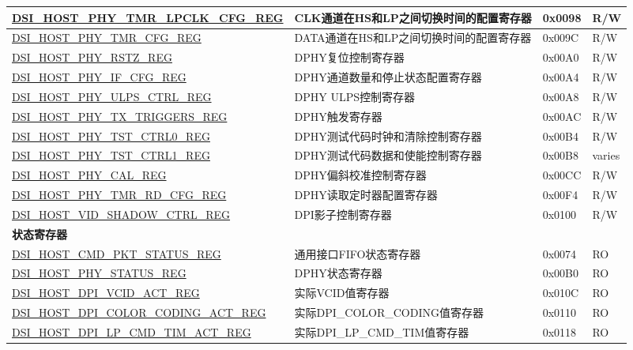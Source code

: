 \begin{longtable}{ | p{6.8cm} | p{6.5cm} | p{1.2cm} | p{1cm} | }
\hyperref[regdesc:DSIHOSTPHYTMRLPCLKCFGREG]{DSI\_HOST\_PHY\_TMR\_LPCLK\_CFG\_REG} & CLK通道在HS和LP之间切换时间的配置寄存器 & 0x0098 & R/W \\ \hline
\hyperref[regdesc:DSIHOSTPHYTMRCFGREG]{DSI\_HOST\_PHY\_TMR\_CFG\_REG} & DATA通道在HS和LP之间切换时间的配置寄存器 & 0x009C & R/W \\ \hline
\hyperref[regdesc:DSIHOSTPHYRSTZREG]{DSI\_HOST\_PHY\_RSTZ\_REG} & DPHY复位控制寄存器 & 0x00A0 & R/W \\ \hline
\hyperref[regdesc:DSIHOSTPHYIFCFGREG]{DSI\_HOST\_PHY\_IF\_CFG\_REG} & DPHY通道数量和停止状态配置寄存器 & 0x00A4 & R/W \\ \hline
\hyperref[regdesc:DSIHOSTPHYULPSCTRLREG]{DSI\_HOST\_PHY\_ULPS\_CTRL\_REG} & DPHY ULPS控制寄存器 & 0x00A8 & R/W \\ \hline
\hyperref[regdesc:DSIHOSTPHYTXTRIGGERSREG]{DSI\_HOST\_PHY\_TX\_TRIGGERS\_REG} & DPHY触发寄存器 & 0x00AC & R/W \\ \hline
\hyperref[regdesc:DSIHOSTPHYTSTCTRL0REG]{DSI\_HOST\_PHY\_TST\_CTRL0\_REG} & DPHY测试代码时钟和清除控制寄存器 & 0x00B4 & R/W \\ \hline
\hyperref[regdesc:DSIHOSTPHYTSTCTRL1REG]{DSI\_HOST\_PHY\_TST\_CTRL1\_REG} & DPHY测试代码数据和使能控制寄存器 & 0x00B8 & varies \\ \hline
\hyperref[regdesc:DSIHOSTPHYCALREG]{DSI\_HOST\_PHY\_CAL\_REG} & DPHY偏斜校准控制寄存器 & 0x00CC & R/W \\ \hline
\hyperref[regdesc:DSIHOSTPHYTMRRDCFGREG]{DSI\_HOST\_PHY\_TMR\_RD\_CFG\_REG} & DPHY读取定时器配置寄存器 & 0x00F4 & R/W \\ \hline
\hyperref[regdesc:DSIHOSTVIDSHADOWCTRLREG]{DSI\_HOST\_VID\_SHADOW\_CTRL\_REG} & DPI影子控制寄存器 & 0x0100 & R/W \\ \hline
\multicolumn{4}{|l|}{\textbf{状态寄存器}} \\ \hline
\hyperref[regdesc:DSIHOSTCMDPKTSTATUSREG]{DSI\_HOST\_CMD\_PKT\_STATUS\_REG} & 通用接口FIFO状态寄存器 & 0x0074 & RO \\ \hline
\hyperref[regdesc:DSIHOSTPHYSTATUSREG]{DSI\_HOST\_PHY\_STATUS\_REG} & DPHY状态寄存器 & 0x00B0 & RO \\ \hline
\hyperref[regdesc:DSIHOSTDPIVCIDACTREG]{DSI\_HOST\_DPI\_VCID\_ACT\_REG} & 实际VCID值寄存器 & 0x010C & RO \\ \hline
\hyperref[regdesc:DSIHOSTDPICOLORCODINGACTREG]{DSI\_HOST\_DPI\_COLOR\_CODING\_ACT\_REG} & 实际DPI\_COLOR\_CODING值寄存器 & 0x0110 & RO \\ \hline
\hyperref[regdesc:DSIHOSTDPILPCMDTIMACTREG]{DSI\_HOST\_DPI\_LP\_CMD\_TIM\_ACT\_REG} & 实际DPI\_LP\_CMD\_TIM值寄存器 & 0x0118 & RO \\ \hline

\end{longtable}
